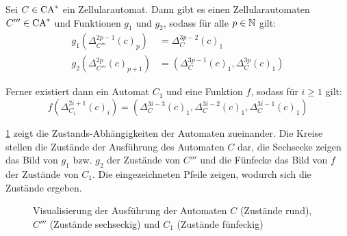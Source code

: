 \begin{satz}
    \label{CAgfSpeedup}
    Sei $C \in \textrm{CA}^*$ ein Zellularautomat.
    Dann gibt es einen Zellularautomaten $C''' \in \textrm{CA}^*$ und Funktionen $g_1$ und $g_2$, sodass für alle $p \in \mathbb{N}$ gilt:
    \begin{align*}
        g_1(\Delta_{C'''}^{2p-1}(c)_p) & = \Delta_C^{3p-2}(c)_1 \\
        g_2(\Delta_{C'''}^{2p}(c)_{p+1}) & = (\Delta_C^{3p-1}(c)_1, \Delta_C^{3p}(c)_1)
    \end{align*}
    
    Ferner existiert dann ein Automat $C_1$ und eine Funktion $f$, sodass für $i \geq 1$ gilt:
    \[
        f(\Delta_{C_1}^{2i+1}(c)_i) = (\Delta_C^{3i-3}(c)_1, \Delta_C^{3i-2}(c)_1, \Delta_C^{3i-1}(c)_1)
    \]
    
    \cref{fig:EchtzeitSpeedup} zeigt die Zustands-Abhängigkeiten der Automaten zueinander.
    Die Kreise stellen die Zustände der Ausführung des Automaten $C$ dar, die Sechsecke zeigen das Bild von $g_1$ bzw. $g_2$
    der Zustände von $C'''$ und die Fünfecke das Bild von $f$ der Zustände von $C_1$. Die eingezeichneten Pfeile
    zeigen, wodurch sich die Zustände ergeben.
    
    \begin{figure}[H]
        \centering
        
        \caption{Visualisierung der Ausführung der Automaten $C$ (Zustände rund), $C'''$ (Zustände sechseckig) und $C_1$ (Zustände fünfeckig)}
        \label{fig:EchtzeitSpeedup}
    \end{figure}
\end{satz}
